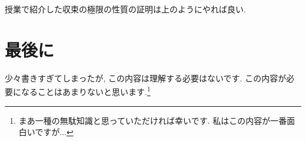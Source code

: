 \documentclass[dvipdfmx,a4paper,11pt]{article}
\theoremstyle{definition}
\begin{document}
授業で紹介した収束の極限の性質の証明は上のようにやれば良い.


\section{最後に}
少々書きすぎてしまったが, この内容は理解する必要はないです.
この内容が必要になることはあまりないと思います.\footnote{まあ一種の無駄知識と思っていただければ幸いです. 私はこの内容が一番面白いですが...}
 
\end{document}
